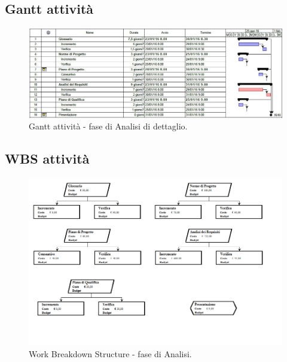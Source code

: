 \documentclass[a4paper]{report}
\begin{document}
			\subsection{Gantt attività}
				\begin{figure}[H]
					\centering
					\includegraphics[scale=0.5]{GanttDettaglio}
					\caption{Gantt attività - fase di Analisi di dettaglio.}
				\end{figure}
			\subsection{WBS attività}
				\begin{figure}[H]
					\centering
					\includegraphics[scale=0.5]{WBSDettaglio}
					\caption{Work Breakdown Structure - fase di Analisi.}
				\end{figure}
\end{document}

